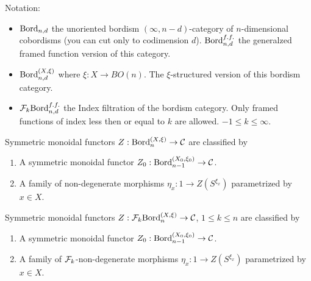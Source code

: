 \documentclass{amsart}
\begin{document}


Notation:
\begin{itemize}
	\item $\mathrm{Bord}_{n,d}$ the unoriented bordism $(\infty, n-d)$-category of $n$-dimensional cobordisms (you can cut only to codimension $d$). $\mathrm{Bord}_{n,d}^{f.f.}$ the generalzed framed function version of this category. 
	\item $\mathrm{Bord}_{n,d}^{(X,\xi)}$ where $\xi:X \to BO(n)$. The $\xi$-structured version of this bordism category.
	\item $\mathcal F_k \mathrm{Bord}_{n,d}^{f.f.}$ the Index filtration of the bordism category. Only framed functions of index less then or equal to $k$ are allowed. $-1\leq k \leq \infty$.  
\end{itemize}



\begin{theorem}
	Symmetric monoidal functors $Z: \mathrm{Bord}^{(X,\xi)}_n \to \mathcal C$ are classified by 
	\begin{enumerate}
		\item A symmetric monoidal functor $Z_0: \mathrm{Bord}^{(X_0,\xi_0)}_{n-1} \to \mathcal C$.
		\item A family of non-degenerate morphisms $\eta_x: 1 \to Z(S^{\xi_x})$ parametrized by $x \in X$. 
	\end{enumerate}
\end{theorem}

\begin{theorem}[alternate]
	Symmetric monoidal functors $Z: \mathcal F_{k}\mathrm{Bord}^{(X,\xi)}_n \to \mathcal C$, $1 \leq k \leq n$ are classified by 
	\begin{enumerate}
		\item A symmetric monoidal functor $Z_0: \mathrm{Bord}^{(X_0,\xi_0)}_{n-1} \to \mathcal C$.
		\item A family of $\mathcal F_k$-non-degenerate morphisms $\eta_x: 1 \to Z(S^{\xi_x})$ parametrized by $x \in X$. 
	\end{enumerate}
\end{theorem}
\end{document}
